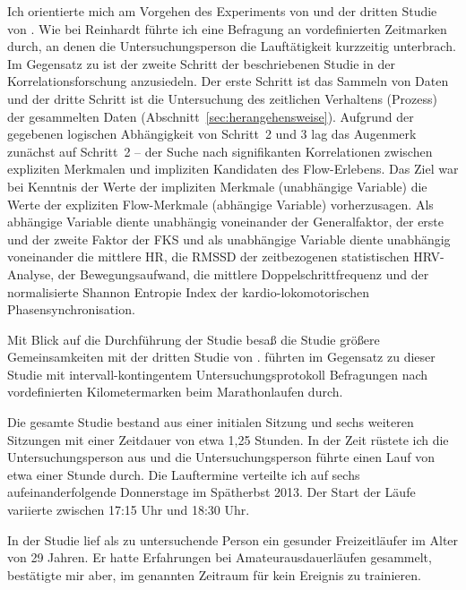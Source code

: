 Ich orientierte mich am Vorgehen des Experiments von \citet{Reinhardt2006} und der dritten Studie von \citet{Schuler2009}. Wie bei Reinhardt führte ich eine Befragung an vordefinierten Zeitmarken durch, an denen die Untersuchungsperson die Lauftätigkeit kurzzeitig unterbrach. Im Gegensatz zu \citet{Reinhardt2006} ist der zweite Schritt der beschriebenen Studie in der Korrelationsforschung anzusiedeln. Der erste Schritt ist das Sammeln von Daten und der dritte Schritt ist die Untersuchung des zeitlichen Verhaltens (Prozess) der gesammelten Daten (Abschnitt~\ref{sec:herangehensweise}). Aufgrund der gegebenen logischen Abhängigkeit von Schritt~2 und 3 lag das Augenmerk zunächst auf Schritt~2 -- der Suche nach signifikanten Korrelationen zwischen expliziten Merkmalen und impliziten Kandidaten des Flow-Erlebens. Das Ziel war bei Kenntnis der Werte der impliziten Merkmale (unabhängige Variable) die Werte der expliziten Flow-Merkmale (abhängige Variable) vorherzusagen. Als abhängige Variable diente unabhängig voneinander der Generalfaktor, der erste und der zweite Faktor der \ac{FKS} und als unabhängige Variable diente unabhängig voneinander die mittlere \ac{HR}, die \acs{RMSSD} der zeitbezogenen statistischen \ac{HRV}-Analyse, der Bewegungsaufwand, die mittlere Doppelschrittfrequenz und der normalisierte Shannon Entropie Index der kardio-lokomotorischen Phasensynchronisation.

Mit Blick auf die Durchführung der Studie besaß die Studie größere Gemeinsamkeiten mit der dritten Studie von \citet{Schuler2009}. \citet{Schuler2009} führten im Gegensatz zu dieser Studie mit intervall-kontingentem Untersuchungsprotokoll Befragungen nach vordefinierten Kilometermarken beim Marathonlaufen durch. 

Die gesamte Studie bestand aus einer initialen Sitzung und sechs weiteren Sitzungen mit einer Zeitdauer von etwa 1,25 Stunden. In der Zeit rüstete ich die Untersuchungsperson aus und die Untersuchungsperson führte einen Lauf von etwa einer Stunde durch. Die Lauftermine verteilte ich auf sechs aufeinanderfolgende Donnerstage im Spätherbst 2013. Der Start der Läufe variierte zwischen 17:15 Uhr und 18:30 Uhr.

In der Studie lief als zu untersuchende Person ein gesunder Freizeitläufer im Alter von 29 Jahren. Er hatte Erfahrungen bei Amateurausdauerläufen gesammelt, bestätigte mir aber, im genannten Zeitraum für kein Ereignis zu trainieren.

